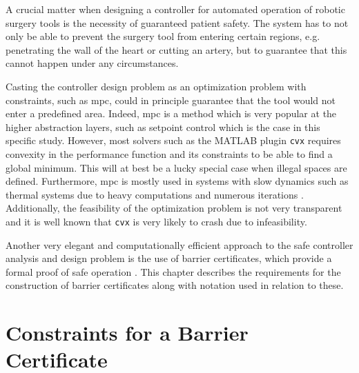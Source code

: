 A crucial matter when designing a controller for automated operation of robotic surgery tools is the necessity of guaranteed patient safety. The system has to not only be able to prevent the surgery tool from entering certain regions, e.g. penetrating the wall of the heart or cutting an artery, but to guarantee that this cannot happen under any circumstances.

Casting the controller design problem as an optimization problem with constraints, such as \gls{mpc}, could in principle guarantee that the tool would not enter a predefined area. Indeed, \gls{mpc} is a method which is very popular at the higher abstraction layers, such as setpoint control \citep{bib:mpc_simon} {\color{red}{TJEK DATO}} which is the case in this specific study. However, most solvers such as the MATLAB plugin \texttt{cvx} requires convexity in the performance function and its constraints to be able to find a global minimum. This will at best be a lucky special case when illegal spaces are defined. Furthermore, \gls{mpc} is mostly used in systems with slow dynamics such as thermal systems due to heavy computations and numerous iterations {\color{red}{Find kilde..}}. Additionally, the feasibility of the optimization problem is not very transparent and it is well known that \texttt{cvx} is very likely to crash due to infeasibility.

Another very elegant and computationally efficient approach to the safe controller analysis and design problem is the use of barrier certificates, which provide a formal proof of safe operation \citep{bib:safety}. This chapter describes the requirements for the construction of barrier certificates along with notation used in relation to these.
%
%
%
%
%
\section{Constraints for a Barrier Certificate}\label{sec:safety-def}

